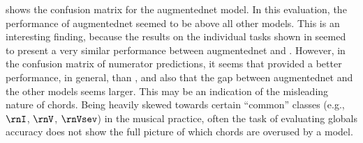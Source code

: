 

 shows the
confusion matrix for the \gls{augmentednet} model. In this
evaluation, the performance of \gls{augmentednet} seemed to
be above all other models. This is an interesting finding,
because the results on the individual tasks shown in
 seemed to present a very similar
performance between \gls{augmentednet} and
\textcite{micchi2021deep}. However, in the confusion matrix
of numerator predictions, it seems that
\textcite{mcleod2021modular} provided a better performance,
in general, than \textcite{micchi2021deep}, and also that
the gap between \gls{augmentednet} and the other models
seems larger. This may be an indication of the misleading
nature of chords. Being heavily skewed towards certain
``common'' classes (e.g., $\rnI$, $\rnV$, $\rnVsev$) in the
musical practice, often the task of evaluating globals
accuracy does not show the full picture of which chords are
overused by a model. 

